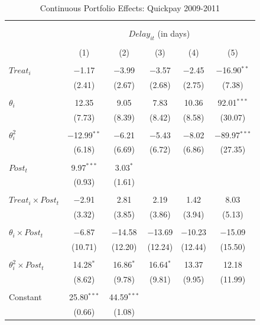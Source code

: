 \documentclass[
]{article}
\begin{document}
\begin{table}[H] \centering 
  \caption{Continuous Portfolio Effects: Quickpay 2009-2011} 
  \label{} 
\small 
\begin{tabular}{@{\extracolsep{-2pt}}lccccc} 
\\[-1.8ex]\hline 
\hline \\[-1.8ex] 
\\[-1.8ex] & \multicolumn{5}{c}{$Delay_{it}$ (in days)} \\ 
\\[-1.8ex] & (1) & (2) & (3) & (4) & (5)\\ 
\hline \\[-1.8ex] 
 $Treat_i$ & $-$1.17 & $-$3.99 & $-$3.57 & $-$2.45 & $-$16.90$^{**}$ \\ 
  & (2.41) & (2.67) & (2.68) & (2.75) & (7.38) \\ 
  & & & & & \\ 
 $\theta_i$ & 12.35 & 9.05 & 7.83 & 10.36 & 92.01$^{***}$ \\ 
  & (7.73) & (8.39) & (8.42) & (8.58) & (30.07) \\ 
  & & & & & \\ 
 $\theta_i^2$ & $-$12.99$^{**}$ & $-$6.21 & $-$5.43 & $-$8.02 & $-$89.97$^{***}$ \\ 
  & (6.18) & (6.69) & (6.72) & (6.86) & (27.35) \\ 
  & & & & & \\ 
 $Post_t$ & 9.97$^{***}$ & 3.03$^{*}$ &  &  &  \\ 
  & (0.93) & (1.61) &  &  &  \\ 
  & & & & & \\ 
 $Treat_i \times Post_t$ & $-$2.91 & 2.81 & 2.19 & 1.42 & 8.03 \\ 
  & (3.32) & (3.85) & (3.86) & (3.94) & (5.13) \\ 
  & & & & & \\ 
 $\theta_i \times Post_t$ & $-$6.87 & $-$14.58 & $-$13.69 & $-$10.23 & $-$15.09 \\ 
  & (10.71) & (12.20) & (12.24) & (12.44) & (15.50) \\ 
  & & & & & \\ 
 $\theta_i^2 \times Post_t$ & 14.28$^{*}$ & 16.86$^{*}$ & 16.64$^{*}$ & 13.37 & 12.18 \\ 
  & (8.62) & (9.78) & (9.81) & (9.95) & (11.99) \\ 
  & & & & & \\ 
 Constant & 25.80$^{***}$ & 44.59$^{***}$ &  &  &  \\ 
  & (0.66) & (1.08) &  &  &  \\ 

\end{tabular}
\end{table}
\end{document}
